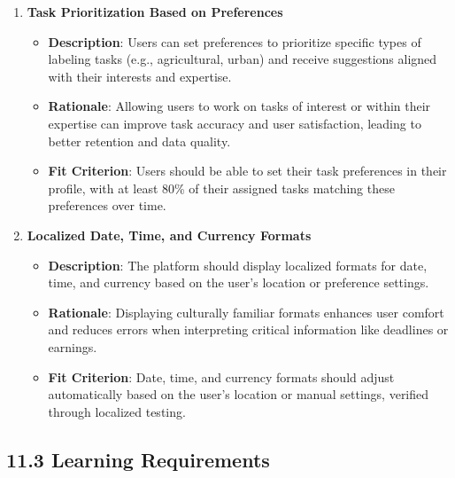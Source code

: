\documentclass[12pt]{article}
\begin{document}
\begin{enumerate}
    \item \textbf{Task Prioritization Based on Preferences}  
        \begin{itemize}[leftmargin=2cm]
            \item \textbf{Description}: Users can set preferences to prioritize specific types of labeling tasks (e.g., agricultural, urban) and receive suggestions aligned with their interests and expertise.  
            \item \textbf{Rationale}: Allowing users to work on tasks of interest or within their expertise can improve task accuracy and user satisfaction, leading to better retention and data quality.  
            \item \textbf{Fit Criterion}: Users should be able to set their task preferences in their profile, with at least 80\% of their assigned tasks matching these preferences over time.
        \end{itemize}
    \item \textbf{Localized Date, Time, and Currency Formats}  
        \begin{itemize}[leftmargin=2cm]
            \item \textbf{Description}: The platform should display localized formats for date, time, and currency based on the user's location or preference settings.  
            \item \textbf{Rationale}: Displaying culturally familiar formats enhances user comfort and reduces errors when interpreting critical information like deadlines or earnings.  
            \item \textbf{Fit Criterion}: Date, time, and currency formats should adjust automatically based on the user’s location or manual settings, verified through localized testing.
        \end{itemize}
\end{enumerate}

\subsection*{11.3 Learning Requirements}
\end{document}
